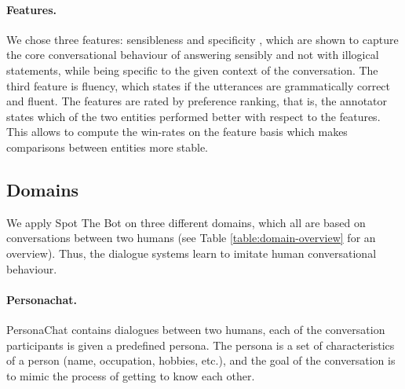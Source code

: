 \documentclass[11pt,a4paper]{article}
\begin{document}
\paragraph{Features.} We chose three features: sensibleness and specificity \cite{adiwardana2020towards}, which are shown to capture the core conversational behaviour of answering sensibly and not with illogical statements, while being specific to the given context of the conversation. The third feature is fluency, which states if the utterances are grammatically correct and fluent. The features are rated by preference ranking, that is, the annotator states which of the two entities performed better with respect to the features. This allows to compute the win-rates on the feature basis which makes comparisons between entities more stable. 


\subsection{Domains}

\begin{table}[h!]
\vspace{-1mm}
\begin{center}
\end{center}
\caption{Overview of the domains}
\label{table:domain-overview}
\end{table}


We apply Spot The Bot on three different domains, which all are based on conversations between two humans (see Table \ref{table:domain-overview} for an overview). Thus, the dialogue systems learn to imitate human conversational behaviour. 

\paragraph{Personachat.} PersonaChat \cite{zhang-etal-2018-personalizing} contains dialogues between two humans, each of the conversation participants is given a predefined persona. The persona is a set of characteristics of a person (name, occupation, hobbies, etc.), and the goal of the conversation is to mimic the process of getting to know each other. 
\end{document}

